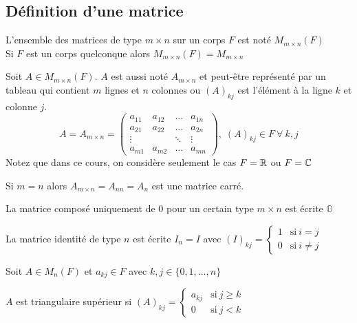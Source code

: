
\subsection{Définition d'une matrice}
\begin{definition}
    L'ensemble des matrices de type $m \times n$ sur un corps $F$ est noté $M_{m \times n}(F)$ \\
    Si $F$ est un corps quelconque alors $M_{m \times n}(F) = M_{m \times n}$
\end{definition}
\begin{definition}
    Soit $A \in M_{m \times n}(F)$. $A$ est aussi noté $A_{m \times n}$ et peut-être représenté
    par un tableau qui contient $m$ lignes et $n$ colonnes ou $\left(A\right)_{kj}$ est l'élément
    à la ligne $k$ et colonne $j$. \[
        A = A_{m \times n} = \begin{pmatrix}
            a_{11} & a_{12}      & \dots  & a_{1n} \\
            a_{21} & a_{22}      & \dots  & a_{2n} \\
            \vdots & \phantom{a} & \ddots & \vdots \\
            a_{m1} & a_{m2}      & \dots  & a_{mn}
        \end{pmatrix}, \; \left(A\right)_{kj} \in F \ \forall \ k, j
    \]
    Notez que dans ce cours, on considère seulement le cas $F = \mathbb{R}$ ou $F = \mathbb{C}$
\end{definition}
\begin{definition}
    Si $m = n$ alors $A_{m \times n} = A_{nn} = A_n$ est une matrice carré.
\end{definition}
\begin{definition}
    La matrice composé uniquement de 0 pour un certain type $m \times n$ est écrite $\mathbb{O}$
\end{definition}
\begin{definition}
    La matrice identité de type $n$ est écrite $I_n = I$ avec $(I)_{kj} = \begin{cases}
            1 & \text{si} \ i = j    \\
            0 & \text{si} \ i \neq j
        \end{cases}$
\end{definition}
Soit $A \in M_n(F)$ et $a_{kj} \in F$ avec $k, j \in \{0, 1, \dots, n\}$
\begin{definition}
    $A$ est triangulaire supérieur si $(A)_{kj} = \begin{cases}
            a_{kj} & \text{si} \ j \geq k \\
            0      & \text{si} \ j < k
        \end{cases}$
\end{definition}
